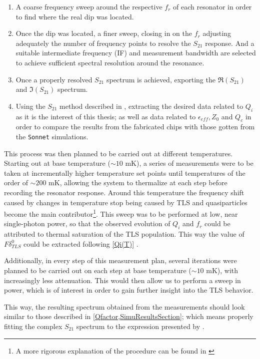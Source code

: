 \documentclass[12pt, a4paper]{article}
\begin{document}
\begin{enumerate}
    \item A coarse frequency sweep around the respective $f_r$ of each resonator in order to find where the real dip was located.
    \item Once the dip was located, a finer sweep, closing in on the $f_r$ adjusting adequately the number of frequency points to resolve the $S_{21}$ response. And a suitable intermediate frequency (IF) and measurement bandwidth are selected to achieve sufficient spectral resolution around the resonance.
    \item Once a properly resolved $S_{21}$ spectrum is achieved, exporting the $\Re (S_{21})$ and $\Im (S_{21})$ spectrum.
    \item Using the $S_{21}$ method described in \cite{Lopez-Nunez2025}, extracting the desired data related to $Q_i$ as it is the interest of this thesis; as well as data related to $\epsilon_{eff}, Z_0$ and $Q_c$ in order to compare the results from the fabricated chips with those gotten from the \texttt{Sonnet} simulations.
\end{enumerate}

This process was then planned to be carried out at different temperatures. Starting out at base temperature ($\sim 10$ mK), a series of measurements were to be taken at incrementally higher temperature set points until temperatures of the order of $\sim 200$ mK, allowing the system to thermalize at each step before recording the resonator response. Around this temperature the frequency shift caused by changes in temperature stop being caused by TLS and quasiparticles become the main contributor\footnote{A more rigorous explanation of the procedure can be found in \cite{Scigliuzzo2020}}. This sweep was to be performed at low, near single-photon power, so that the observed evolution of $Q_i$ and $f_r$ could be attributed to thermal saturation of the TLS population. This way the value of $F \delta^0_{TLS}$ could be extracted following \cref{Qi(T)} \cite{Scigliuzzo2020}.

Additionally, in every step of this measurement plan, several iterations were planned to be carried out on each step at base temperature ($\sim 10$ mK), with increasingly less attenuation. This would then allow us to perform a sweep in power, which is of interest in order to gain further insight into the TLS behavior.

This way, the resulting spectrum obtained from the measurements should look similar to those described in \cref{Qfactor,SimuResultsSection}; which means properly fitting the complex $S_{21}$ spectrum to the expression presented by \cite{Lopez-Nunez2025}.
\end{document}
